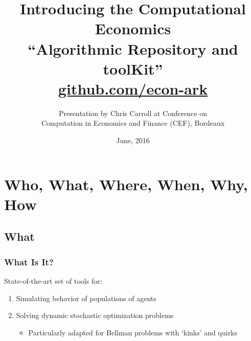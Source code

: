 \documentclass[public]{beamer}
\providecommand{\ARK}{\href{http://github.com/econ-ark}{github.com/econ-ark}}
\begin{document}
\title[\ARK]{Introducing  the Computational Economics \\ ``Algorithmic Repository and toolKit'' \\
\href{http://github.com/econ-ark}{github.com/econ-ark}}

\author[Chris Carroll]{Presentation by Chris Carroll at Conference on \\ 
{Computation in Economics and Finance (CEF), Bordeaux}}
\date{June, 2016}



\begin{frame}
  \titlepage
\end{frame}

\section{Who, What, Where, When, Why, How}
\subsection{What}

\begin{frame}
\frametitle{What Is It?}

State-of-the-art set of tools for:

\begin{enumerate} \pause
\item Simulating behavior of populations of agents
\item Solving dynamic stochastic optimization problems
\begin{itemize}
\item Particularly adapted for Bellman problems with `kinks' and quirks
\end{itemize}
\end{enumerate}
\end{frame}
\end{document}

